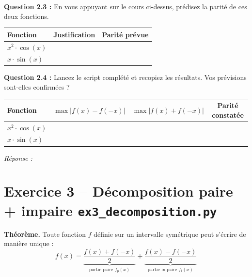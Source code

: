 \documentclass[12pt,a4paper]{article}
\newcommand{\cadreReponse}[1][4]{%
    \begin{mdframed}[backgroundcolor=repbg, linecolor=repframe, linewidth=1pt,
        roundcorner=4pt, innertopmargin=6pt, innerbottommargin=6pt]
    \textcolor{repframe}{\small\textit{Réponse :}}\\[#1\baselineskip]
    \end{mdframed}%
}
\begin{document}
\medskip

\begin{exercicebox}
\textbf{Question 2.3 :} En vous appuyant sur le cours ci-dessus, prédisez la parité de ces deux fonctions.

\medskip
\renewcommand{\arraystretch}{1.8}
\begin{center}
\begin{tabular}{|l|p{4cm}|c|}
    \hline
    \textbf{Fonction} & \textbf{Justification} & \textbf{Parité prévue} \\
    \hline
    $x^2 \cdot \cos(x)$ & & \\[10pt]
    \hline
    $x \cdot \sin(x)$ & & \\[10pt]
    \hline
\end{tabular}
\end{center}
\end{exercicebox}

\newpage 


\begin{exercicebox}
\textbf{Question 2.4 :} Lancez le script complété et recopiez les résultats. Vos prévisions sont-elles confirmées ?

\medskip
\renewcommand{\arraystretch}{2}
\begin{center}
\begin{tabular}{|l|c|c|c|}
    \hline
    \textbf{Fonction} & $\max|f(x)-f(-x)|$ & $\max|f(x)+f(-x)|$ & \textbf{Parité constatée} \\
    \hline
    $x^2 \cdot \cos(x)$ & & & \\
    \hline
    $x \cdot \sin(x)$ & & & \\
    \hline
\end{tabular}
\end{center}
\end{exercicebox}

\cadreReponse[5]


\section{Exercice 3 -- Décomposition paire + impaire \hfill\normalsize\texttt{ex3\_decomposition.py}}

\begin{rappelbox}
\textbf{Théorème.} Toute fonction $f$ définie sur un intervalle symétrique peut s'écrire de manière unique :
\[
    f(x) = \underbrace{\frac{f(x) + f(-x)}{2}}_{\text{partie paire } f_p(x)} + \underbrace{\frac{f(x) - f(-x)}{2}}_{\text{partie impaire } f_i(x)}
\]
\end{rappelbox}
\end{document}
